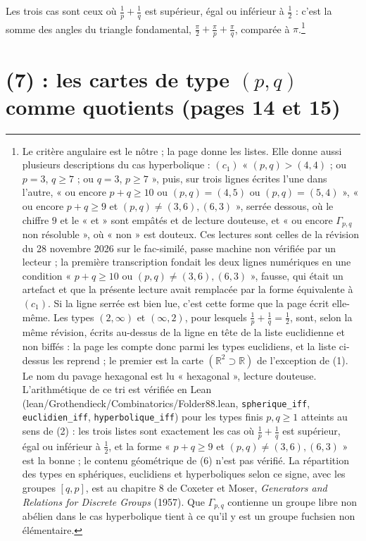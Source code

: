 \documentclass[11pt,a4paper]{article}
\begin{document}
Les trois cas sont ceux où $\frac{1}{p} + \frac{1}{q}$ est supérieur, égal ou
inférieur à $\frac{1}{2}$ : c'est la somme des angles du triangle
fondamental, $\frac{\pi}{2} + \frac{\pi}{p} + \frac{\pi}{q}$, comparée à
$\pi$.\footnote{Le critère angulaire est le nôtre ; la page donne les listes.
Elle donne aussi plusieurs descriptions du cas hyperbolique : $(c_{1})$ « $(p,q) >
(4,4)$ ; ou $p = 3$, $q \geq 7$ ; ou $q = 3$, $p \geq 7$ », puis, sur trois
lignes écrites l'une dans l'autre, « ou encore $p + q \geq 10$ ou $(p,q) =
(4,5)$ ou $(p,q) = (5,4)$ », « ou encore $p + q \geq 9$ et $(p,q) \neq (3,6),
(6,3)$ », serrée dessous, où le chiffre $9$ et le « et » sont empâtés et de
lecture douteuse, et « ou encore $\Gamma_{p,q}$ non résoluble », où « non » est
douteux. Ces lectures sont celles de la révision du 28 novembre 2026 sur le fac-similé, passe machine non vérifiée par un lecteur ; la
première transcription fondait les deux lignes numériques en une condition
« $p + q \geq 10$ ou $(p,q) \neq (3,6), (6,3)$ », fausse, qui était un artefact
et que la présente lecture avait remplacée par la forme équivalente à
$(c_{1})$. Si la ligne serrée est bien lue, c'est cette forme que la page écrit
elle-même. Les types $(2, \infty)$ et $(\infty, 2)$, pour
lesquels $\frac{1}{p} + \frac{1}{q} = \frac{1}{2}$, sont, selon la même
révision, écrits au-dessus de la ligne en tête de la liste euclidienne et non
biffés : la page les compte donc parmi les types euclidiens, et la liste
ci-dessus les reprend ; le premier est la carte
$(\mathbb{R}^{2} \supset \mathbb{R})$ de l'exception de (1).
Le nom du pavage hexagonal est lu « hexagonal », lecture douteuse. L'arithmétique de ce tri est
vérifiée en Lean (lean/Grothendieck/Combinatorics/Folder88.lean, \texttt{spherique\_iff},
\texttt{euclidien\_iff}, \texttt{hyperbolique\_iff}) pour les types finis
$p, q \geq 1$ atteints au sens de (2) : les trois listes sont exactement les
cas où $\frac{1}{p} + \frac{1}{q}$ est supérieur, égal ou inférieur à
$\frac{1}{2}$, et la forme « $p + q \geq 9$ et $(p,q) \neq (3,6), (6,3)$ » est
la bonne ; le contenu
géométrique de (6) n'est pas vérifié. La répartition des types en sphériques,
euclidiens et hyperboliques selon ce signe, avec les groupes $[q,p]$, est au
chapitre 8 de Coxeter et Moser, \emph{Generators and Relations for Discrete
Groups} (1957). Que $\Gamma_{p,q}$ contienne un groupe
libre non abélien dans le cas hyperbolique tient à ce qu'il y est un groupe
fuchsien non élémentaire.}

\section*{(7) : les cartes de type $(p,q)$ comme quotients (pages 14 et 15)}
\end{document}
